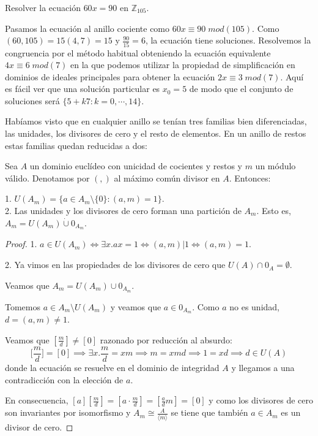 \begin{example}
Resolver la ecuación $60x = 90$ en $\mathbb{Z}_{105}$.

Pasamos la ecuación al anillo cociente como $60x \equiv 90 \; mod(105)$. Como $(60,105)=15(4,7) = 15$ y $\frac{90}{15} = 6$, la ecuación tiene soluciones. Resolvemos la congruencia por el método habitual obteniendo la ecuación equivalente $4x \equiv 6 \; mod(7)$ en la que podemos utilizar la propiedad de simplificación en dominios de ideales principales para obtener la ecuación $2x \equiv 3 \; mod(7)$. Aquí es fácil ver que una solución particular es $x_0 = 5$ de modo que el conjunto de soluciones será $\{5+k7:k=0,\cdots,14\}$. 
\end{example}

Habíamos visto que en cualquier anillo se tenían tres familias bien diferenciadas, las unidades, los divisores de cero y el resto de elementos. En un anillo de restos estas familias quedan reducidas a dos:

\begin{proposition}
Sea $A$ un dominio euclídeo con unicidad de cocientes y restos y $m$ un módulo válido. Denotamos por $(,)$ al máximo común divisor en $A$. Entonces:

1. $U(A_m) = \{a \in A_m \setminus \{0\}:(a,m) = 1\}$.\\
2. Las unidades y los divisores de cero forman una partición de $A_m$. Esto es, $A_m = U(A_m) \dot\cup 0_{A_m}$.  
\end{proposition}
\begin{proof}
1. $a \in U(A_m) \iff \exists x. ax = 1 \iff (a,m)|1 \iff (a,m) = 1$.

2. Ya vimos en las propiedades de los divisores de cero que $U(A) \cap 0_A = \emptyset$. 

Veamos que $A_m = U(A_m) \cup 0_{A_m}$. 

Tomemos $a \in A_m \setminus U(A_m)$ y veamos que $a \in 0_{A_m}$.  Como $a$ no es unidad, $d = (a,m) \neq 1$.

Veamos que $[\frac{m}{d}] \neq [0]$ razonado por reducción al absurdo: $$\Big[\frac{m}{d}\Big] = [0] \implies \exists x. \frac{m}{d} = xm \implies m = xmd \implies 1 = xd \implies d \in U(A)$$ donde la ecuación se resuelve en el dominio de integridad $A$ y llegamos a una contradicción con la elección de $a$. 

En consecuencia, $[a][\frac{m}{d}] = [a \cdot \frac{m}{d}] = [\frac{a}{d}m] = [0]$ y como los divisores de cero son invariantes por isomorfismo y $A_m \cong \frac{A}{\langle m \rangle}$ se tiene que también $a \in A_m$ es un divisor de cero.
\end{proof}

